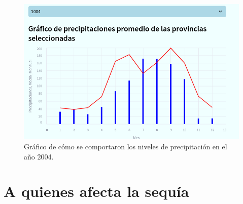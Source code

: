 \documentclass[12pt]{article}
\begin{document}
	\begin{figure}
		\centering
		\includegraphics[width=0.7\linewidth]{./Report/images/2.png}
		\caption{Gráfico de cómo se comportaron los niveles de precipitación en el año 2004.}
	\end{figure}
	\newpage
	\section{A quienes afecta la sequía}
	
\end{document}

